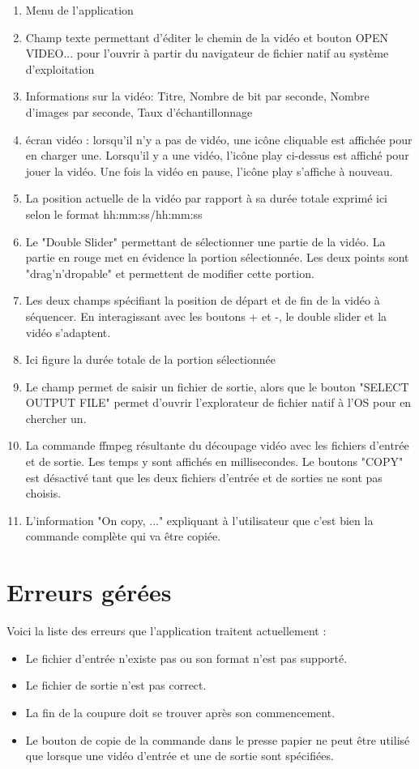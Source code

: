 \documentclass[11pt, a4paper, french]{article}
\begin{document}
	 \begin{enumerate}
	 	\item Menu de l'application
	 	\item Champ texte permettant d'éditer le chemin de la vidéo et bouton OPEN VIDEO... pour l'ouvrir à partir du navigateur de fichier natif au système d'exploitation
	 	\item Informations sur la vidéo: Titre, Nombre de bit par seconde, Nombre d'images par seconde, Taux d'échantillonnage
	 	\item écran vidéo : lorsqu'il n'y a pas de vidéo, une icône cliquable est affichée pour en charger une. Lorsqu'il y a une vidéo, l'icône play ci-dessus est affiché pour jouer la vidéo. Une fois la vidéo en pause, l'icône play s'affiche à nouveau.
	 	\item La position actuelle de la vidéo par rapport à sa durée totale exprimé ici selon le format hh:mm:ss/hh:mm:ss
	 	\item Le "Double Slider" permettant de sélectionner une partie de la vidéo. La partie en rouge met en évidence la portion sélectionnée. Les deux points sont "drag'n'dropable" et permettent de modifier cette portion.
	 	\item Les deux champs spécifiant la position de départ et de fin de la vidéo à séquencer. En interagissant avec les boutons + et -, le double slider et la vidéo s'adaptent.
	 	\item Ici figure la durée totale de la portion sélectionnée
	 	\item Le champ permet de saisir un fichier de sortie, alors que le bouton "SELECT OUTPUT FILE" permet d'ouvrir l'explorateur de fichier natif à l'OS pour en chercher un.
	 	\item La commande ffmpeg résultante du découpage vidéo avec les fichiers d'entrée et de sortie. Les temps y sont affichés en millisecondes. Le boutons "COPY" est désactivé tant que les deux fichiers d'entrée et de sorties ne sont pas choisis.
	 	\item L'information "On copy, ..." expliquant à l'utilisateur que c'est bien la commande complète qui va être copiée.
	 \end{enumerate}
 
	\part*{Erreurs gérées}
		Voici la liste des erreurs que l'application traitent actuellement :
		\begin{itemize}
			\item Le fichier d'entrée n'existe pas ou son format n'est pas supporté.
			\item Le fichier de sortie n'est pas correct.
			\item La fin de la coupure doit se trouver après son commencement.
			\item Le bouton de copie de la commande dans le presse papier ne peut être utilisé que lorsque une vidéo d'entrée et une de sortie sont spécifiées.
		\end{itemize}
\end{document}
